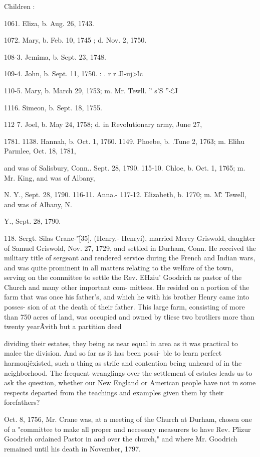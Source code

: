 \documentclass{book}
\begin{document}
Children : 

1061. Eliza, b. Aug. 26, 1743. 

1072. Mary, b. Feb. 10, 1745 ; d. Nov. 2, 1750. 

108-3. Jemima, b. Sept. 23, 1748. 

109-4. John, b. Sept. 11, 1750. : . r r Jl-uj>\^ lc 

110-5. Mary, b. March 29, 1753; m. Mr. Tewll. '' s'S ''\^ <J 

1116. Simeon, b. Sept. 18, 1755. 

112  7. Joel, b. May 24, 1758; d. in Revolutionary army, June 27, 

1781. 
1138. Hannah, b. Oct. 1, 1760. 
1149. Phoebe, b. .Tune 2, 1763; m. Elihu Parmlee, Oct. 18, 1781, 

and was of Salisbury, Conn.. Sept. 28, 1790. 
115-10. Chloe, b. Oct. 1, 1765; m. Mr. King, and was of Albany, 

N. Y., Sept. 28, 1790. 
116-11. Anna.- 
117-12. Elizabeth, b. 1770; m. M\^\^. Tewell, and was of Albany, N. 

Y., Sept. 28, 1790. 

118. Sergt. Silas Crane-"\^ [35], (Henry,- Henryi), married 
Mercy Griswold, daughter of Samuel Griswold, Nov. 27, 1729, 
and settled in Durham, Conn. He received the military title of 
sergeant and rendered service during the French and Indian wars, 
and was quite prominent in all matters relating to the welfare of 
the town, serving on the connnittee to settle the Rev. EHziu' 
Goodrich as pastor of the Church and many other important com- 
mittees. He resided on a portion of the farm that was once his 
father's, and which he with his brother Henry came into posses- 
sion of at the death of their father. This large farm, consisting 
of more than 750 acres of land, was occupied and owned by tliese 
two brotliers more than twenty year\^\^ Avith but a partition deed 




dividing their estates, they being as near equal in area as it was 
practical to malce the division. And so far as it has been possi- 
ble to learn perfect harmonj\^ existed, such a thing as strife and 
contention being unheard of in the neighborhood. The frequent 
wranglings over the settlement of estates leads us to ask the 
question, whether our New England or American people have not 
in some respects departed from the teachings and examples given 
them by their forefathers? 

Oct. 8, 1756, Mr. Crane was, at a meeting of the Church at 
Durham, chosen one of a "committee to make all proper and 
necessary measurers to have Rev. P\^lizur Goodrich ordained Pastor 
in and over the church," and where Mr. Goodrich remained until 
his death in November, 1797. 
\end{document}
